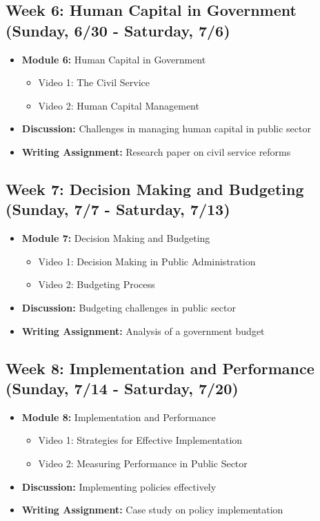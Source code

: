 \documentclass[12pt, letterpaper]{article}
\begin{document}
\subsection*{Week 6: Human Capital in Government (Sunday, 6/30 - Saturday, 7/6)}
\begin{itemize}
    \item \textbf{Module 6:} Human Capital in Government
    \begin{itemize}
        \item Video 1: The Civil Service
        \item Video 2: Human Capital Management
    \end{itemize}
    \item \textbf{Discussion:} Challenges in managing human capital in public sector
    \item \textbf{Writing Assignment:} Research paper on civil service reforms
\end{itemize}

\subsection*{Week 7: Decision Making and Budgeting (Sunday, 7/7 - Saturday, 7/13)}
\begin{itemize}
    \item \textbf{Module 7:} Decision Making and Budgeting
    \begin{itemize}
        \item Video 1: Decision Making in Public Administration
        \item Video 2: Budgeting Process
    \end{itemize}
    \item \textbf{Discussion:} Budgeting challenges in public sector
    \item \textbf{Writing Assignment:} Analysis of a government budget
\end{itemize}

\subsection*{Week 8: Implementation and Performance (Sunday, 7/14 - Saturday, 7/20)}
\begin{itemize}
    \item \textbf{Module 8:} Implementation and Performance
    \begin{itemize}
        \item Video 1: Strategies for Effective Implementation
        \item Video 2: Measuring Performance in Public Sector
    \end{itemize}
    \item \textbf{Discussion:} Implementing policies effectively
    \item \textbf{Writing Assignment:} Case study on policy implementation
\end{itemize}
\end{document}
